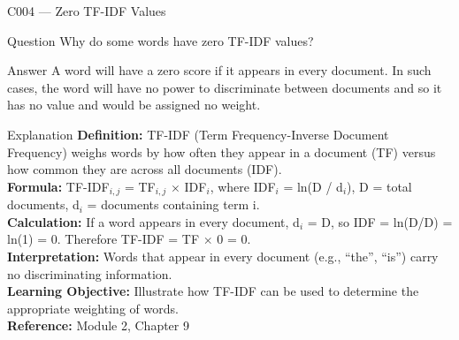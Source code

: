 \documentclass[aspectratio=169,8pt]{beamer}
\begin{document}
	\begin{frame}{C004 --- Zero TF-IDF Values}
		\begin{block}{Question}
			Why do some words have zero TF-IDF values?
		\end{block}
		\begin{block}{Answer}
			A word will have a zero score if it appears in every document. In such cases, the word will have no power to discriminate between documents and so it has no value and would be assigned no weight.
		\end{block}
		\begin{block}{Explanation}
			\textbf{Definition:} TF-IDF (Term Frequency-Inverse Document Frequency) weighs words by how often they appear in a document (TF) versus how common they are across all documents (IDF).\\
			\textbf{Formula:} TF-IDF$_{i,j}$ = TF$_{i,j}$ $\times$ IDF$_i$, where IDF$_i$ = ln(D / d$_i$), D = total documents, d$_i$ = documents containing term i.\\
			\textbf{Calculation:} If a word appears in every document, d$_i$ = D, so IDF = ln(D/D) = ln(1) = 0. Therefore TF-IDF = TF $\times$ 0 = 0.\\
			\textbf{Interpretation:} Words that appear in every document (e.g., ``the'', ``is'') carry no discriminating information.\\
			\textbf{Learning Objective:} Illustrate how TF-IDF can be used to determine the appropriate weighting of words.\\
			\textbf{Reference:} Module 2, Chapter 9
		\end{block}
	\end{frame}
	
\end{document}
